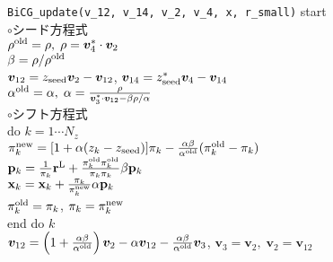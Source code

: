\documentclass[12pt,titlepage]{jarticle}
\renewenvironment{leftbar}{%
  \def\FrameCommand{\vrule width 1pt \hspace{0pt}}%
  \MakeFramed {\advance\hsize-\width \FrameRestore}}%
 {\endMakeFramed}
\begin{document}
\begin{leftbar}
  \noindent
  \hspace{0.5cm}
  \verb|BiCG_update(v_12, v_14, v_2, v_4, x, r_small)| start
  \\\hspace{1.0cm}
  $\circ$シード方程式
  \\\hspace{1.0cm}
  $\rho^{\rm old} = \rho,\; \rho = {\boldsymbol v}_4^* \cdot {\boldsymbol v}_2$
  \\\hspace{1.0cm}
  $\beta = \rho / \rho^{\rm old}$
  \\\hspace{1.0cm}
  ${\boldsymbol v}_{1 2} = z_{\rm seed} {\boldsymbol v}_2 - {\boldsymbol v}_{1 2}$, 
  ${\boldsymbol v}_{1 4} = z_{\rm seed}^* {\boldsymbol v}_4 - {\boldsymbol v}_{1 4}$
  \\\hspace{1.0cm}
  $\alpha^{\rm old} = \alpha,\; 
  \alpha = \frac{\rho}{{\boldsymbol v}_3^* \cdot {\boldsymbol v}_{1 2} - \beta \rho / \alpha }$
  \\\hspace{1.0cm}
  $\circ$シフト方程式
  \\\hspace{1.0cm}
  do $k = 1 \cdots N_z$
  \\\hspace{1.5cm}
  $\pi_k^{\rm new} = [1+\alpha(z_k-z_{\rm seed})]\pi_k - \frac{\alpha \beta}{\alpha^{\rm old}}(\pi_k^{\rm old} - \pi_k)$
  \\\hspace{1.5cm}
  ${\bf p}_{k} = \frac{1}{\pi_k} {\bf r}^{\rm L} + 
  \frac{\pi^{\rm old}_k \pi^{\rm old}_k}{\pi_k \pi_k} \beta {\bf p}_{k}$
  \\\hspace{1.5cm}
  ${\bf x}_{k} = {\bf x}_{k} + \frac{\pi_k}{\pi_k^{\rm new}} \alpha {\bf p}_{k}$
  \\\hspace{1.5cm}
  $\pi_k^{\rm old} = \pi_k$, $\pi_k = \pi_k^{\rm new}$
  \\\hspace{1.0cm}
  end do $k$
  \\\hspace{1.0cm}
  ${\boldsymbol v}_{1 2} = \left( 1 + \frac{\alpha \beta}{\alpha^{\rm old}} \right) {\boldsymbol v}_2
  - \alpha {\boldsymbol v}_{1 2} - \frac{\alpha \beta}{\alpha^{\rm old}} {\boldsymbol v}_3$, 
  ${\boldsymbol v}_3 = {\boldsymbol v}_2,\;
  {\boldsymbol v}_2 = {\boldsymbol v}_{1 2}$

\end{leftbar}
\end{document}
